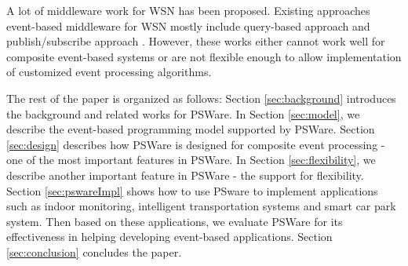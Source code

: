 A lot of middleware work for WSN has been proposed. Existing approaches event-based middleware for WSN mostly include query-based approach \cite{tinydb} and publish/subscribe approach \cite{complexevent}. However, these works either cannot work well for composite event-based systems or are not flexible enough to allow implementation of customized event processing algorithms. 



The rest of the paper is organized as follows: Section \ref{sec:background} introduces the background and related works for PSWare. In Section \ref{sec:model}, we describe the event-based programming model supported by PSWare. Section \ref{sec:design} describes how PSWare is designed for composite event processing - one of the most important features in PSWare. In Section \ref{sec:flexibility}, we describe another important feature in PSWare - the support for flexibility. Section \ref{sec:pswareImpl} shows how to use PSware to implement applications such as indoor monitoring, intelligent transportation systems and smart car park system. Then based on these applications, we evaluate PSWare for its effectiveness in helping developing event-based applications. Section \ref{sec:conclusion} concludes the paper.
